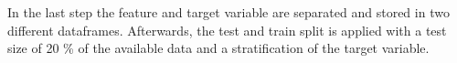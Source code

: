 In the last step the feature and target variable are separated and stored in two different dataframes. Afterwards, the test and train split is applied with a test size of 20 \% of the available data and a stratification of the target variable.


